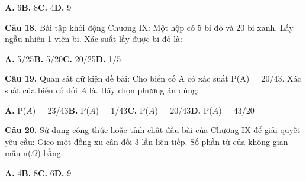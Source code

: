 \documentclass[11pt,a4paper]{article}
\begin{document}
\hspace*{1.5em}\textbf{A.} 6\quad\quad \textbf{B.} 8\quad\quad \textbf{C.} 4\quad\quad \textbf{D.} 9\par\vspace{2pt}
\textbf{\color{primary} Câu 18.} Bài tập khởi động Chương IX: Một hộp có 5 bi đỏ và 20 bi xanh. Lấy ngẫu nhiên 1 viên bi. Xác suất lấy được bi đỏ là:\par
\hspace*{1.5em}\textbf{A.} 5/25\quad\quad \textbf{B.} 5/20\quad\quad \textbf{C.} 20/25\quad\quad \textbf{D.} 1/5\par\vspace{2pt}
\textbf{\color{primary} Câu 19.} Quan sát dữ kiện đề bài: Cho biến cố A có xác suất P(A) = 20/43. Xác suất của biến cố đối $\bar{A}$ là. Hãy chọn phương án đúng:\par
\hspace*{1.5em}\textbf{A.} P($\bar{A}$) = 23/43\quad\quad \textbf{B.} P($\bar{A}$) = 1/43\quad\quad \textbf{C.} P($\bar{A}$) = 20/43\quad\quad \textbf{D.} P($\bar{A}$) = 43/20\par\vspace{2pt}
\textbf{\color{primary} Câu 20.} Sử dụng công thức hoặc tính chất đầu bài của Chương IX để giải quyết yêu cầu: Gieo một đồng xu cân đối 3 lần liên tiếp. Số phần tử của không gian mẫu n($\Omega$) bằng:\par
\hspace*{1.5em}\textbf{A.} 4\quad\quad \textbf{B.} 8\quad\quad \textbf{C.} 6\quad\quad \textbf{D.} 9\par\vspace{2pt}
\end{document}
